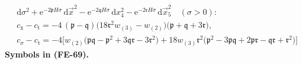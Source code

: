 \documentclass[
  10pt,
]{article}
\begin{document}
\[
\begin{aligned}
&\mathrm{d}\sigma^2 + \mathrm{e}^{-2\mathfrak{p}H\sigma}\,\mathrm{d}\vec x^2 - \mathrm{e}^{-2\mathfrak{q}H\sigma}\,\mathrm{d}x_4^2
 - \mathrm{e}^{-2\mathfrak{r}H\sigma}\,\mathrm{d}\vec x_5^2\quad(\sigma > 0):\\
&c_{\mathrm{x}} - c_{\mathrm{t}} = -4\,(\mathfrak{p} - \mathfrak{q})\big(18\mathfrak{r}^2w_{(3)} - w_{(2)}\big)\big(\mathfrak{p} + \mathfrak{q} + 3\mathfrak{r}\big),\\
&c_\sigma - c_{\mathrm{t}} = -4\big[w_{(2)}\big(\mathfrak{p}\mathfrak{q} - \mathfrak{p}^2 + 3\mathfrak{q}\mathfrak{r} - 3\mathfrak{r}^2\big)
 + 18w_{(3)}\mathfrak{r}^2\big(\mathfrak{p}^2 - 3\mathfrak{p}\mathfrak{q} + 2\mathfrak{p}\mathfrak{r} - \mathfrak{q}\mathfrak{r} + \mathfrak{r}^2\big)\big]
\end{aligned} \tag{FE-69}
\] \textbf{Symbols in (FE-69).}
\end{document}
